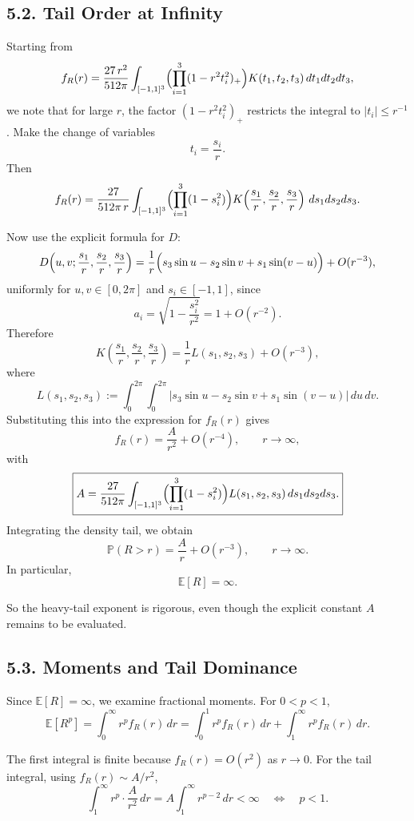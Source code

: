 \documentclass[11pt]{article}
\begin{document}
\subsection*{5.2. Tail Order at Infinity}

Starting from
\[
f_R(r)
=
\frac{27\,r^2}{512\pi}
\int_{[-1,1]^3}
\Bigl(\prod_{i=1}^3 (1-r^2 t_i^2)_+\Bigr)
K(t_1,t_2,t_3)\,dt_1dt_2dt_3,
\]
we note that for large $r$, the factor $(1-r^2 t_i^2)_+$ restricts the integral to
$|t_i|\le r^{-1}$. Make the change of variables
\[
t_i=\frac{s_i}{r}.
\]
Then
\[
f_R(r)
=
\frac{27}{512\pi\,r}
\int_{[-1,1]^3}
\Bigl(\prod_{i=1}^3 (1-s_i^2)\Bigr)
K\!\left(\frac{s_1}{r},\frac{s_2}{r},\frac{s_3}{r}\right)\,ds_1ds_2ds_3.
\]

Now use the explicit formula for $D$:
\[
D\!\left(u,v;\frac{s_1}{r},\frac{s_2}{r},\frac{s_3}{r}\right)
=
\frac{1}{r}\Bigl(
s_3\sin u-s_2\sin v+s_1\sin(v-u)
\Bigr)
+ O(r^{-3}),
\]
uniformly for $u,v\in[0,2\pi]$ and $s_i\in[-1,1]$, since
\[
a_i=\sqrt{1-\frac{s_i^2}{r^2}}=1+O(r^{-2}).
\]
Therefore
\[
K\!\left(\frac{s_1}{r},\frac{s_2}{r},\frac{s_3}{r}\right)
=
\frac{1}{r}L(s_1,s_2,s_3)+O(r^{-3}),
\]
where
\[
L(s_1,s_2,s_3)
:=
\int_0^{2\pi}\int_0^{2\pi}
\left|
s_3\sin u-s_2\sin v+s_1\sin(v-u)
\right|\,du\,dv.
\]
Substituting this into the expression for $f_R(r)$ gives
\[
f_R(r)
=
\frac{A}{r^2}+O(r^{-4}),
\qquad r\to\infty,
\]
with
\[
\boxed{
A
=
\frac{27}{512\pi}
\int_{[-1,1]^3}
\Bigl(\prod_{i=1}^3 (1-s_i^2)\Bigr)
L(s_1,s_2,s_3)\,ds_1ds_2ds_3.
}
\]
Integrating the density tail, we obtain
\[
\boxed{
\mathbb{P}(R>r)=\frac{A}{r}+O(r^{-3}),
\qquad r\to\infty.
}
\]
In particular,
\[
\boxed{
\mathbb{E}[R]=\infty.
}
\]

So the heavy-tail exponent is rigorous, even though the explicit constant $A$ remains to be
evaluated.

\subsection*{5.3. Moments and Tail Dominance}

Since $\mathbb{E}[R] = \infty$, we examine fractional moments. For $0 < p < 1$,
\[
\mathbb{E}[R^p]
=
\int_0^\infty r^p f_R(r)\,dr
=
\int_0^1 r^p f_R(r)\,dr + \int_1^\infty r^p f_R(r)\,dr.
\]

The first integral is finite because $f_R(r) = O(r^2)$ as $r \to 0$. For the tail integral, using
$f_R(r) \sim A/r^2$,
\[
\int_1^\infty r^p \cdot \frac{A}{r^2}\,dr = A\int_1^\infty r^{p-2}\,dr < \infty \quad \iff \quad p < 1.
\]
\end{document}
